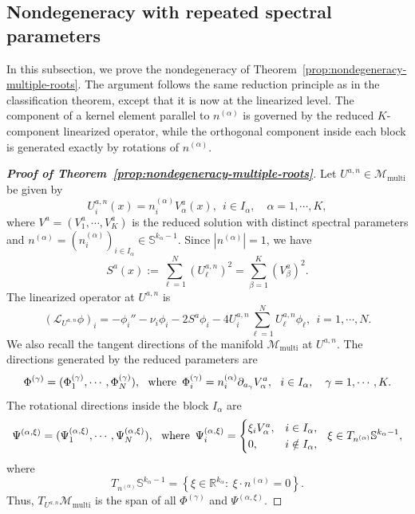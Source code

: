 \documentclass[11pt]{article}
\numberwithin{equation}{section}
\theoremstyle{definition}
\begin{document}
\subsection{Nondegeneracy  with repeated spectral parameters}\label{sub4.2}
In this subsection, we prove the nondegeneracy of Theorem~\ref{prop:nondegeneracy-multiple-roots}. The argument follows the same reduction principle as in the classification theorem, except that it is now at the linearized level. The component of a kernel element parallel to \(n^{(\alpha)}\) is governed by the reduced \(K\)-component linearized operator, while the orthogonal component inside each block is generated exactly by rotations of \(n^{(\alpha)}\).



\begin{proof}[\normalfont\bfseries Proof of Theorem~\ref{prop:nondegeneracy-multiple-roots}]
Let
\(U^{a,n}\in\mathcal M_{\mathrm{multi}}\) be given by
\[
U_i^{a,n}(x)=n_i^{(\alpha)}V_{\alpha}^a(x),
\ \
i\in I_\alpha,\quad \alpha=1,\cdots,K,
\]
where \(V^a=(V_1^a,\cdots,V_K^a)\) is the reduced solution with distinct
spectral parameters and
\(n^{(\alpha)}=(n_i^{(\alpha)})_{i\in I_\alpha}\in
\mathbb S^{k_\alpha-1}\). Since \(|n^{(\alpha)}|=1\), we have
\[
S^{a}(x):=\sum_{\ell=1}^N (U_\ell^{a,n})^2
=
\sum_{\beta=1}^K (V_\beta^a)^2 .
\]
The linearized operator at \(U^{a,n}\) is
\[
(\mathcal L_{U^{a,n}}\phi)_i
=
-\phi_i''
-\nu_i\phi_i
-2S^{a}\phi_i
-4U_i^{a,n}\sum_{\ell=1}^N U_\ell^{a,n}\phi_\ell,
\ \  i=1,\cdots,N.
\]
We also recall the tangent directions of the manifold
\(\mathcal M_{\mathrm{multi}}\) at \(U^{a,n}\). The directions generated by
the reduced parameters are
\[
\Phi^{(\gamma)}=(\Phi_1^{(\gamma)},\cdots,\Phi_N^{(\gamma)}),\ \ \hbox{where}\,\ \Phi_i^{(\gamma)}
=
n_i^{(\alpha)}\partial_{a_\gamma}V_\alpha^a,
\ \
i\in I_\alpha,\quad \gamma=1,\cdots,K.
\]
The rotational directions inside the block \(I_\alpha\) are
\[
\Psi^{(\alpha,\xi)}=(\Psi_1^{(\alpha,\xi)},\cdots,\Psi_N^{(\alpha,\xi)}),\ \ \hbox{where}\,\ \Psi_i^{(\alpha,\xi)}
=
\begin{cases}
	\xi_i V_\alpha^a, & i\in I_\alpha,\\
	0, & i\notin I_\alpha,
\end{cases}
\ \
\xi\in T_{n^{(\alpha)}}\mathbb S^{k_\alpha-1},
\]
where
\[
T_{n^{(\alpha)}}\mathbb S^{k_\alpha-1}
=
\left\{\xi\in\mathbb R^{k_\alpha}:\ \xi\cdot n^{(\alpha)}=0\right\}.
\]
Thus, \(T_{U^{a,n}}\mathcal M_{\mathrm{multi}}\) is the span of all
\(\Phi^{(\gamma)}\) and \(\Psi^{(\alpha,\xi)}\).




\end{proof}
\end{document}
